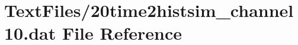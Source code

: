 \hypertarget{20time2histsim__channel10_8dat}{}\section{Text\+Files/20time2histsim\+\_\+channel10.dat File Reference}
\label{20time2histsim__channel10_8dat}
